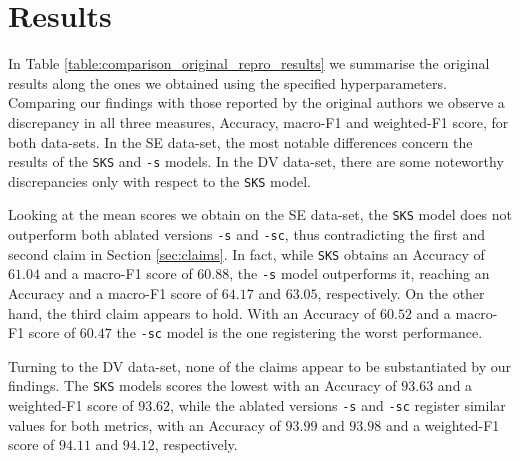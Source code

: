 \section{Results}
\label{sec:results}

In Table \ref{table:comparison_original_repro_results} we summarise the original results along the ones we obtained using the specified hyperparameters. Comparing our findings with those reported by the original authors we observe a discrepancy in all three measures, Accuracy, macro-F1 and weighted-F1 score, for both data-sets. In the SE data-set, the most notable differences concern the results of the \texttt{SKS} and \texttt{-s} models. In the DV data-set, there are some noteworthy discrepancies only with respect to the \texttt{SKS} model.

Looking at the mean scores we obtain on the SE data-set, the \texttt{SKS} model does not outperform both ablated versions \texttt{-s} and \texttt{-sc}, thus contradicting the first and second claim in Section \ref{sec:claims}. In fact, while \texttt{SKS} obtains an Accuracy of $61.04$ and a macro-F1 score of $60.88$, the \texttt{-s} model outperforms it, reaching an Accuracy and a macro-F1 score of $64.17$ and $63.05$, respectively. On the other hand, the third claim appears to hold. With an Accuracy of $60.52$ and a macro-F1 score of $60.47$ the \texttt{-sc} model is the one registering the worst performance.

Turning to the DV data-set, none of the claims appear to be substantiated by our findings. The \texttt{SKS} models scores the lowest with an Accuracy of $93.63$ and a weighted-F1 score of $93.62$, while the ablated versions \texttt{-s} and \texttt{-sc} register similar values for both metrics, with an Accuracy of $93.99$ and $93.98$ and a weighted-F1 score of $94.11$ and $94.12$, respectively.

